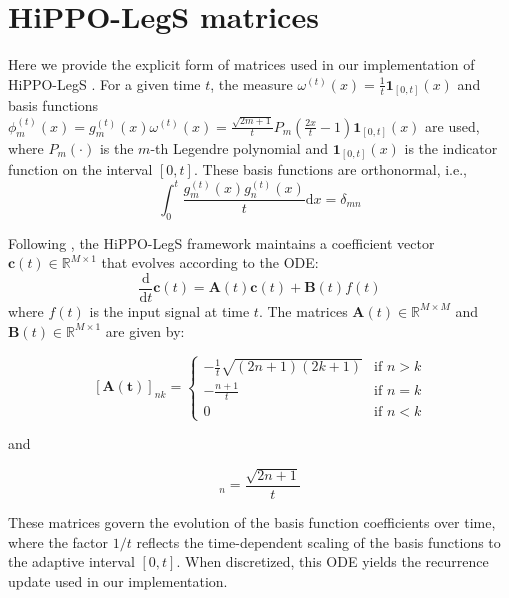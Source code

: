 \section{HiPPO-LegS matrices}
\label{appendix:hippo-legs-matrices}

Here we provide the explicit form of matrices used in our implementation of HiPPO-LegS \citep{gu_hippo_2020}. For a given time $t$, the measure $\omega^{(t)}(x) = \frac{1}{t}\mathbf{1}_{[0,t]}(x)$ and basis functions $\phi_m^{(t)}(x) = g_m^{(t)}(x)\omega^{(t)}(x) = \frac{\sqrt{2m+1}}{t}P_m\left(\frac{2x}{t}-1\right)\mathbf{1}_{[0,t]}(x)$ are used, where $P_m(\cdot)$ is the $m$-th Legendre polynomial and $\mathbf{1}_{[0,t]}(x)$ is the indicator function on the interval $[0,t]$. These basis functions are orthonormal, i.e.,
\begin{equation}
\int_0^t \frac{g_m^{(t)}(x)g_n^{(t)}(x)}{t}\mathrm{d}x = \delta_{mn}
\end{equation}

Following \citet{gu_hippo_2020}, the HiPPO-LegS framework maintains a coefficient vector $\mathbf{c}(t) \in \mathbb{R}^{M \times 1}$ that evolves according to the ODE:
\begin{equation}
\frac{\mathrm{d}}{\mathrm{d}t}\mathbf{c}(t) = \mathbf{A}(t)\mathbf{c}(t) + \mathbf{B}(t)f(t)
\end{equation}
where $f(t)$ is the input signal at time $t$. The matrices $\mathbf{A}(t) \in \mathbb{R}^{M \times M}$ and $\mathbf{B}(t) \in \mathbb{R}^{M \times 1}$ are given by:

\begin{equation}
\label{eq:hippo_matrix_a}
[\mathbf{A(t)}]_{nk} = \begin{cases}
    -\frac{1}{t}\sqrt{(2n+1)(2k+1)} & \text{if } n > k \\
    -\frac{n+1}{t} & \text{if } n = k \\
    0 & \text{if } n < k
\end{cases}
\end{equation}

and

\begin{equation}
[\mathbf{B(t)}]_n = \frac{\sqrt{2n+1}}{t}
\end{equation}

These matrices govern the evolution of the basis function coefficients over time, where the factor $1/t$ reflects the time-dependent scaling of the basis functions to the adaptive interval $[0,t]$. When discretized, this ODE yields the recurrence update used in our implementation.

